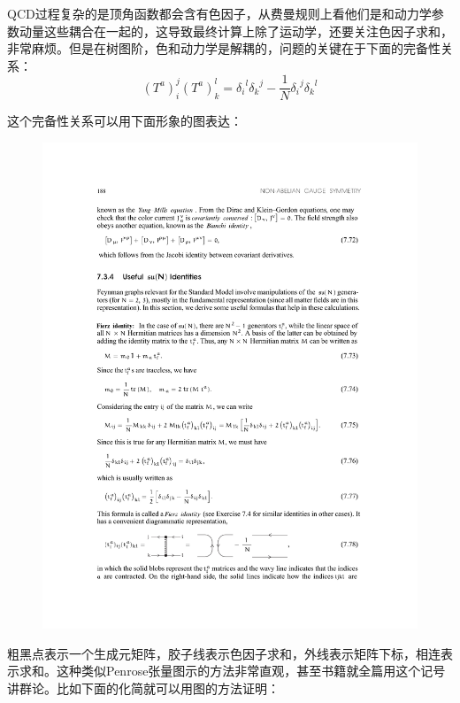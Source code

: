 QCD过程复杂的是顶角函数都会含有色因子，从费曼规则上看他们是和动力学参数动量这些耦合在一起的，这导致最终计算上除了运动学，还要关注色因子求和，非常麻烦。但是在树图阶，色和动力学是解耦的，问题的关键在于下面的完备性关系：
\begin{equation}
	(T^a)_i^j(T^a)_k^l={\delta_i}^l{\delta_k}^j-\frac1N{\delta_i}^j{\delta_k}^l
\end{equation}
\begin{remark}
	这个完备性关系可以用下面形象的图表达：
	\begin{figure}[H]
		\centering
		\includegraphics{figs/fig18.pdf}
	\end{figure}
	粗黑点表示一个生成元矩阵，胶子线表示色因子求和，外线表示矩阵下标，相连表示求和。这种类似Penrose张量图示的方法非常直观，甚至书籍\cite{cvitanovic_group_2008}就全篇用这个记号讲群论。比如下面的化简就可以用图的方法证明：
	\begin{figure}[H]
		\centering

\end{figure}
\end{remark}
